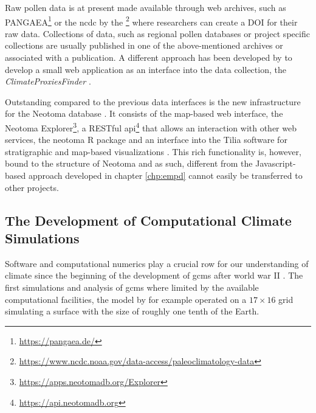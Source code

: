 \begin{refsection}
Raw pollen data is at present made available through web archives, such as PANGAEA\footnote{\url{https://pangaea.de/}} or the \gls{ncdc} by the \footnote{\url{https://www.ncdc.noaa.gov/data-access/paleoclimatology-data}} where researchers can create a DOI for their raw data. Collections of data, such as regional pollen databases or project specific collections \citep[e.g.][]{WhitmoreGajewskiSawadaEtAl2005, DavisZanonCollinsEtAl2013} are usually published in one of the above-mentioned archives or associated with a publication. A different approach has been developed by \cite{BollietBrockmannMassonDelmotteEtAl2016} to develop a small web application as an interface into the data collection, the \textit{ClimateProxiesFinder} \citep[, see also chapter \ref{chp:empd}]{Brockmann2016}. 

Outstanding compared to the previous data interfaces is the new infrastructure for the Neotoma database \citep{WilliamsGrimmBloisEtAl2018}. It consists of the map-based web interface, the Neotoma Explorer\footnote{\url{https://apps.neotomadb.org/Explorer}}, a RESTful api\footnote{\url{https://api.neotomadb.org}} that allows an interaction with other web services, the neotoma R package \citep{GoringDawsonSimpsonEtAl2015} and an interface into the Tilia software for stratigraphic and map-based visualizations \citep{WilliamsGrimmBloisEtAl2018}. This rich functionality is, however, bound to the structure of Neotoma and as such, different from the Javascript-based approach developed in chapter \ref{chp:empd} cannot easily be transferred to other projects.


\subsection{The Development of Computational Climate Simulations} \label{sec:intro-software-model}
Software and computational numerics play a crucial row for our understanding of climate since the beginning of the development of \glspl{gcm} after world war II \citep{Edwards2010, Phillips1956, Lewis1998}. The first simulations and analysis of \glspl{gcm} where limited by the available computational facilities, the model by \cite{Phillips1956} for example operated on a $17 \times 16$ grid simulating a surface with the size of roughly one tenth of the Earth. 



\end{refsection}
